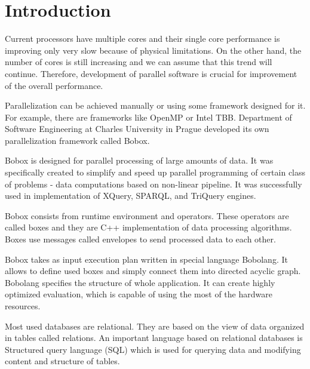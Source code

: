 \chapter{Introduction}

Current processors have multiple cores and their single core performance is improving only very slow because of physical limitations. On the other hand, the number of cores is still increasing and we can assume that this trend will continue. Therefore, development of parallel software is crucial for improvement of the overall performance.

Parallelization can be achieved manually or using some framework designed for it. For example, there are frameworks like OpenMP or Intel TBB. Department of Software Engineering at Charles University in Prague developed its own parallelization framework called Bobox\cite{bobox}.

Bobox is designed for parallel processing of large amounts of data. It was specifically created to simplify and speed up parallel programming of certain class of problems - data computations based on non-linear pipeline. It was successfully used in implementation of XQuery, SPARQL\cite{sparql}, and TriQuery\cite{triquery} engines.

Bobox consists from runtime environment and operators. These operators are called boxes and they are C++ implementation of data processing algorithms. Boxes use messages called envelopes to send processed data to each other. 

Bobox takes as input execution plan written in special language Bobolang\cite{bobolang}. It allows to define used boxes and simply connect them into directed acyclic graph. Bobolang specifies the structure of whole application. It can create highly optimized evaluation, which is capable of using the most of the hardware resources.

Most used databases are relational. They are based on the view of data organized in tables called relations. An important language based on relational databases is Structured query language (SQL\cite{concepts}) which is used for querying data and  modifying content and structure of tables.


